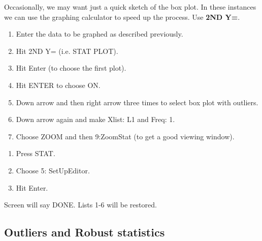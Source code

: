 \begin{termBox}{
Occasionally, we may want just a quick sketch of the box plot. In these instances we can use the graphing calculator to speed up the process.   Use \textbf{2ND Y=}.
\begin{enumerate}
\item Enter the data to be graphed as described previously.
\item Hit 2ND Y= (i.e. STAT PLOT).
\item Hit Enter (to choose the first plot).
\item Hit ENTER to choose ON.
\item Down arrow and then right arrow three times to select box plot with outliers.
\item Down arrow again and make Xlist: L1 and Freq: 1.
\item Choose ZOOM and then 9:ZoomStat (to get a good viewing window).
\end{enumerate}
}
\end{termBox}

\begin{tipBox}{
\begin{enumerate}
\item Press STAT.
\item Choose 5: SetUpEditor.
\item Hit Enter.
\end{enumerate}
\quad Screen will say DONE.  Lists 1-6 will be restored.
}
\end{tipBox}




\subsection{Outliers and Robust statistics}

